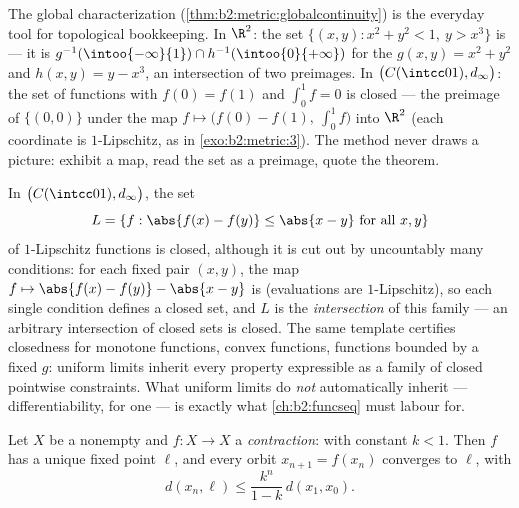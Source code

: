 \begin{example}\label{ex:b2:metric:recognize}
The global characterization
(\cref{thm:b2:metric:globalcontinuity}) is the everyday tool for
topological bookkeeping. In $\R^2$: the set $\{(x, y) : x^2 + y^2
< 1,\ y > x^3\}$ is  --- it is $g^{-1}(\intoo{-\infty}{1})
\cap h^{-1}(\intoo{0}{+\infty})$ for the  $g(x,y) =
x^2 + y^2$ and $h(x, y) = y - x^3$, an intersection of two 
preimages. In $\bigl(C(\intcc01), d_\infty\bigr)$: the set of
functions with $f(0) = f(1)$ and $\int_0^1 f = 0$ is closed ---
the preimage of $\{(0,0)\}$ under the  map $f \mapsto
\bigl(f(0) - f(1),\ \int_0^1 f\bigr)$ into $\R^2$ (each
coordinate is $1$-Lipschitz, as in \cref{exo:b2:metric:3}). The
method never draws a picture: exhibit a  map, read the
set as a preimage, quote the theorem.
\end{example}

\begin{example}\label{ex:b2:metric:lipclosed}
In $\bigl(C(\intcc01), d_\infty\bigr)$, the set
\[
L = \{f : \abs{f(x) - f(y)} \leq \abs{x - y}
\ \text{for all } x, y\}
\]
of $1$-Lipschitz functions is closed, although it is cut out by
uncountably many conditions: for each fixed pair $(x, y)$, the
map $f \mapsto \abs{f(x) - f(y)} - \abs{x - y}$ is 
(evaluations are $1$-Lipschitz), so each single condition
defines a closed set, and $L$ is the \emph{intersection} of
this family --- an arbitrary intersection of closed sets is
closed. The same template certifies closedness for monotone
functions, convex functions, functions bounded by a fixed $g$:
uniform limits inherit every property expressible as a family
of closed pointwise constraints. What uniform limits do
\emph{not} automatically inherit --- differentiability, for
one --- is exactly what \cref{ch:b2:funcseq} must labour for.
\end{example}

\begin{theorem}\label{thm:b2:metric:banach}
Let $X$ be a nonempty  and $f \colon X \to X$ a
\emph{contraction}:  with constant $k < 1$. Then $f$ has a
unique fixed point $\ell$, and every orbit $x_{n+1} = f(x_n)$
converges to $\ell$, with
\[
d(x_n, \ell) \leq \frac{k^n}{1 - k}\, d(x_1, x_0) .
\]
\end{theorem}

